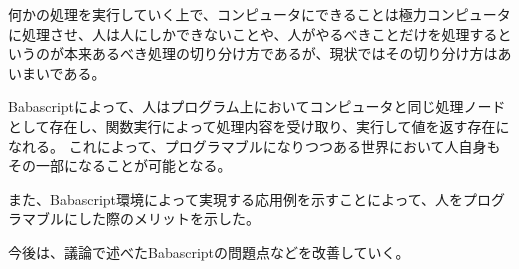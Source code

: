 \documentclass[twoside]{wiss}
\begin{document}
何かの処理を実行していく上で、コンピュータにできることは極力コンピュータに処理させ、人は人にしかできないことや、人がやるべきことだけを処理するというのが本来あるべき処理の切り分け方であるが、現状ではその切り分け方はあいまいである。

Babascriptによって、人はプログラム上においてコンピュータと同じ処理ノードとして存在し、関数実行によって処理内容を受け取り、実行して値を返す存在になれる。
これによって、プログラマブルになりつつある世界において人自身もその一部になることが可能となる。

また、Babascript環境によって実現する応用例を示すことによって、人をプログラマブルにした際のメリットを示した。

今後は、議論で述べたBabascriptの問題点などを改善していく。


{\scriptsize


}
\end{document}
